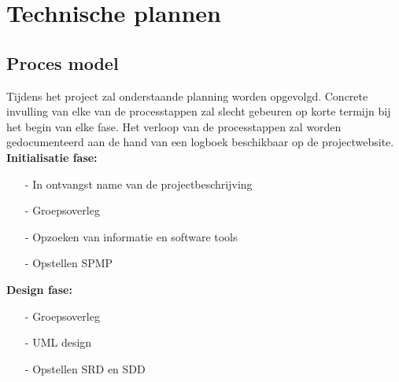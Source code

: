 \documentclass{article}
\begin{document}
\newpage
\section{Technische plannen}

\subsection{Proces model}

Tijdens het project zal onderstaande planning worden opgevolgd. Concrete invulling van elke van de processtappen zal slecht gebeuren op korte termijn bij het begin van elke fase. Het verloop van de processtappen zal worden gedocumenteerd aan de hand van een logboek beschikbaar op de
projectwebsite. \\[3mm]

\textbf{Initialisatie fase:}
\begin{itemize}
\item[-] In ontvangst name van de projectbeschrijving\\[-5mm]
\item[-] Groepsoverleg\\[-5mm]
\item[-] Opzoeken van informatie en software tools\\[-5mm]
\item[-] Opstellen SPMP\\[-5mm]
\end{itemize}


\textbf{Design fase:}
\begin{itemize}
\item[-]Groepsoverleg\\[-5mm]
\item[-]UML design\\[-5mm]
\item[-]Opstellen SRD en SDD\\[-5mm]
\end{itemize}
\end{document}
